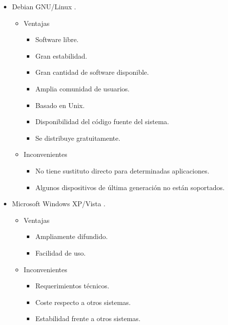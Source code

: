    \begin{itemize}
    \item Debian GNU/Linux \cite{debian}.
      \begin{itemize}
         \item Ventajas
            \begin{itemize}
             \item Software libre.
             \item Gran estabilidad.
             \item Gran cantidad de software disponible.
             \item Amplia comunidad de usuarios.
             \item Basado en Unix.
             \item Disponibilidad del código fuente del sistema.
             \item Se distribuye gratuitamente.
            \end{itemize}
         \item Inconvenientes
            \begin{itemize}
            \item No tiene sustituto directo para determinadas aplicaciones.
            \item Algunos dispositivos de última generación no están soportados.
            \end{itemize}
      \end{itemize}
    \item Microsoft Windows XP/Vista \cite{microsoft}.
      \begin{itemize}
         \item Ventajas
            \begin{itemize}
             \item Ampliamente difundido.
             \item Facilidad de uso.
            \end{itemize}
         \item Inconvenientes
            \begin{itemize}
            \item Requerimientos técnicos.
            \item Coste respecto a otros sistemas.
            \item Estabilidad frente a otros sistemas.
            \end{itemize}
      \end{itemize}
   \end{itemize}

